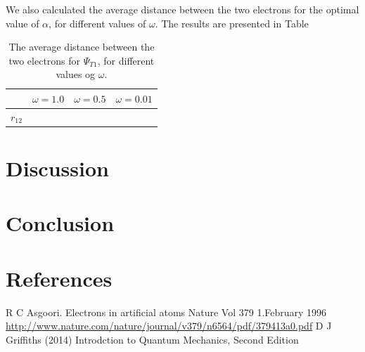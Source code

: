\documentclass[norsk,a4paper,12pt]{article}
\begin{document}
We also calculated the average distance between the two electrons for the optimal value of $\alpha$, for different values of $\omega$. The results are presented in Table 

\begin{table} [H]
\centering
\caption{The average distance between the two electrons for $\Psi_{T1}$, for different values og $\omega$.}

\begin{tabularx}{\textwidth}{XXXX} \hline
\label{2x2Lattice_Microstates}
{\bf } & {\bf $\omega = 1.0$ } & {\bf $ \omega = 0.5 $ } & {\bf $\omega = 0.01$} \\ \hline
{$r_{12}$} & & & &\\ \hline 
\end{tabularx}
\end{table}


\section{Discussion}
\section{Conclusion}

\newpage
\section{References}
\begingroup
\renewcommand{\section}[2]{}
\begin{thebibliography}{}
  R C Asgoori. 
  Electrons in artificial atoms
  Nature Vol 379 1.February 1996
  \url{http://www.nature.com/nature/journal/v379/n6564/pdf/379413a0.pdf}
  D J Griffiths (2014)
  Introdction to Quantum Mechanics, Second Edition
  
  

\end{thebibliography}
\end{document}
